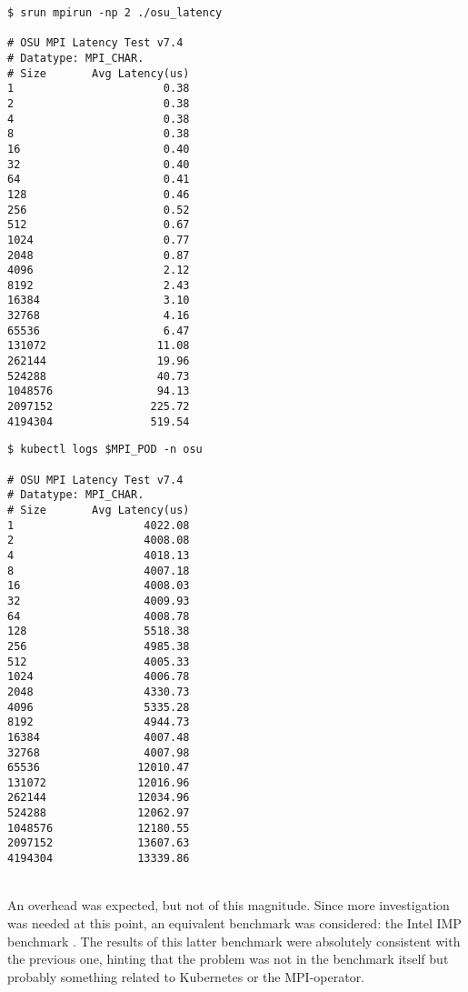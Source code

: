 \begin{minipage}[t]{0.48\textwidth}
\begin{verbatim}
$ srun mpirun -np 2 ./osu_latency

# OSU MPI Latency Test v7.4
# Datatype: MPI_CHAR.
# Size       Avg Latency(us)
1                       0.38
2                       0.38
4                       0.38
8                       0.38
16                      0.40
32                      0.40
64                      0.41
128                     0.46
256                     0.52
512                     0.67
1024                    0.77
2048                    0.87
4096                    2.12
8192                    2.43
16384                   3.10
32768                   4.16
65536                   6.47
131072                 11.08
262144                 19.96
524288                 40.73
1048576                94.13
2097152               225.72
4194304               519.54
\end{verbatim}
\end{minipage}
\hfill
\begin{minipage}[t]{0.48\textwidth}
\begin{verbatim}
$ kubectl logs $MPI_POD -n osu

# OSU MPI Latency Test v7.4
# Datatype: MPI_CHAR.
# Size       Avg Latency(us)
1                    4022.08
2                    4008.08
4                    4018.13
8                    4007.18
16                   4008.03
32                   4009.93
64                   4008.78
128                  5518.38
256                  4985.38
512                  4005.33
1024                 4006.78
2048                 4330.73
4096                 5335.28
8192                 4944.73
16384                4007.48
32768                4007.98
65536               12010.47
131072              12016.96
262144              12034.96
524288              12062.97
1048576             12180.55
2097152             13607.63
4194304             13339.86
\end{verbatim}
\end{minipage}
\\


An overhead was expected, but not of this magnitude. Since more investigation
was needed at this point, an equivalent benchmark was considered: the Intel IMP
benchmark \cite{intel-imb}.
The results of this latter benchmark were absolutely consistent with the
previous one, hinting that the problem was not in the benchmark itself but
probably something related to Kubernetes or the MPI-operator.

